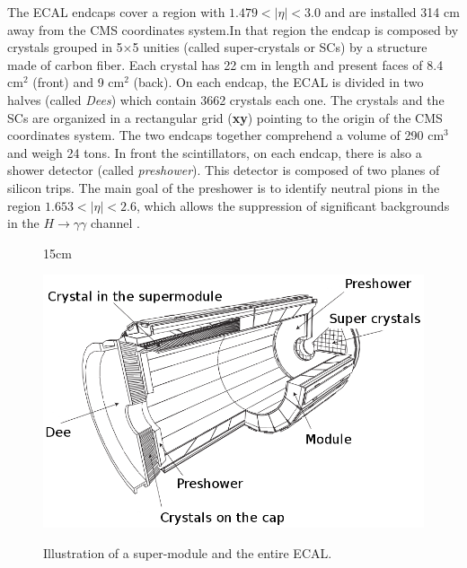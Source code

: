 The ECAL endcaps cover a region with $1.479 < |\eta| < 3.0$ and are installed 314 cm away from the CMS coordinates system.In that region the endcap is composed by crystals grouped in 5$\times$5 unities (called super-crystals or SCs) by a structure made of carbon fiber. Each crystal has 22 cm in length and present faces of 8.4 cm$^{2}$ (front) and 9 cm$^{2}$ (back). On each endcap, the ECAL is divided in two halves (called \textit{Dees}) which contain 3662 crystals each one. The crystals and the SCs are organized in a rectangular grid (\textbf{xy}) pointing to the origin of the CMS coordinates system. The two endcaps together comprehend a volume of 290 cm$^{3}$ and weigh 24 tons. In front the scintillators, on each endcap, there is also a shower detector (called \textit{preshower}). This detector is composed of two planes of silicon trips. The main goal of the preshower is to identify neutral pions in the region $1.653 < |\eta| < 2.6$, which allows the suppression of significant backgrounds in the $H \rightarrow \gamma\gamma$ channel \cite{bib:JINST-3-362-2008,bib:CMS-PTDR-2006}.

\begin{figure}[htbp]{15cm}
\caption{Illustration of a super-module and the entire ECAL.}
\includegraphics[scale=0.4]{ChapterCMS/figs/ecal_sched.png}
\label{fig:ecal}
\end{figure}

